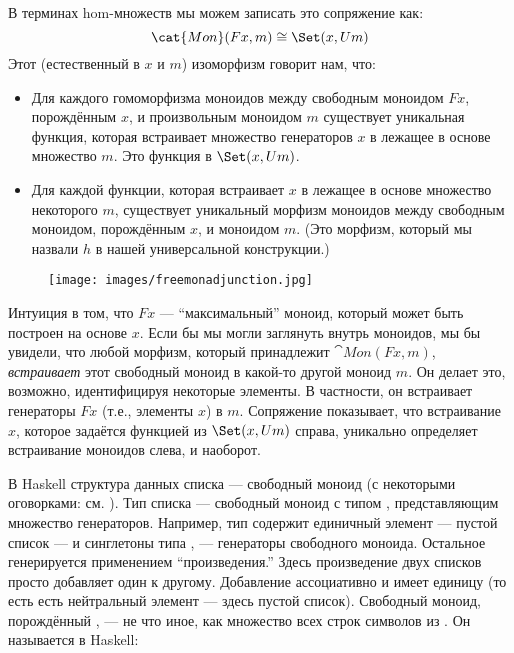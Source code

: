 \noindent
В терминах hom-множеств мы можем записать это сопряжение как:
\[\cat{Mon}(F x, m) \cong \Set(x, U m)\]
Этот (естественный в $x$ и $m$) изоморфизм говорит нам, что:

\begin{itemize}
  \tightlist
  \item
        Для каждого гомоморфизма моноидов между свободным моноидом $F x$,
        порождённым $x$, и произвольным моноидом $m$ существует
        уникальная функция, которая встраивает множество генераторов $x$ в
        лежащее в основе множество $m$. Это функция в
        $\Set(x, U m)$.
  \item
        Для каждой функции, которая встраивает $x$ в лежащее в основе множество
        некоторого $m$, существует уникальный морфизм моноидов между свободным
        моноидом, порождённым $x$, и моноидом $m$. (Это
        морфизм, который мы назвали $h$ в нашей универсальной конструкции.)
\end{itemize}

\begin{figure}[H]
  \centering
  \texttt{[image: images/freemonadjunction.jpg]}
\end{figure}

\noindent
Интуиция в том, что $F x$ --- ``максимальный'' моноид, который может
быть построен на основе $x$. Если бы мы могли заглянуть внутрь моноидов, мы бы
увидели, что любой морфизм, который принадлежит $\cat{Mon}(F x, m)$,
\emph{встраивает} этот свободный моноид в какой-то другой моноид $m$. Он делает
это, возможно, идентифицируя некоторые элементы. В частности, он встраивает
генераторы $F x$ (т.е., элементы $x$) в
$m$. Сопряжение показывает, что встраивание $x$, которое
задаётся функцией из $\Set(x, U m)$ справа,
уникально определяет встраивание моноидов слева, и наоборот.

В Haskell структура данных списка --- свободный моноид (с некоторыми оговорками:
см. ). Тип списка \code{{[}a{]}} --- свободный моноид с
типом , представляющим множество генераторов. Например,
тип \code{{[}Char{]}} содержит единичный элемент --- пустой
список \code{{[}{]}} --- и синглетоны типа
\code{{[}'a'{]}}, \code{{[}'b'{]}} ---
генераторы свободного моноида. Остальное генерируется применением
``произведения.'' Здесь произведение двух списков просто добавляет один к
другому. Добавление ассоциативно и имеет единицу (то есть есть
нейтральный элемент --- здесь пустой список). Свободный моноид, порождённый
, --- не что иное, как множество всех строк символов из
. Он называется  в Haskell:

